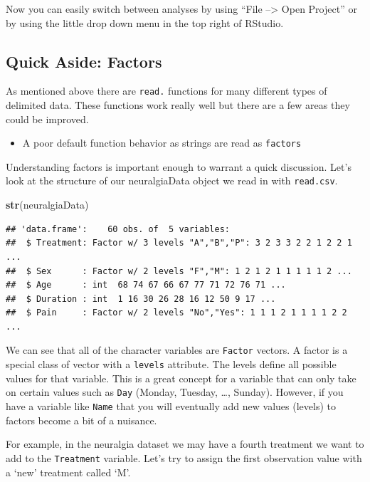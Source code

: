 \documentclass[
]{book}
\newenvironment{Shaded}{\begin{snugshade}}{\end{snugshade}}
\newcommand{\KeywordTok}[1]{\textcolor[rgb]{0.13,0.29,0.53}{\textbf{#1}}}
\newcommand{\NormalTok}[1]{#1}
\providecommand{\tightlist}{%
  \setlength{\itemsep}{0pt}\setlength{\parskip}{0pt}}
\theoremstyle{definition}
\theoremstyle{definition}
\theoremstyle{definition}
\theoremstyle{remark}
\begin{document}
Now you can easily switch between analyses by using ``File --\textgreater{} Open Project'' or by using the little drop down menu in the top right of RStudio.

\hypertarget{quick-aside-factors}{%
\subsection{Quick Aside: Factors}\label{quick-aside-factors}}

As mentioned above there are \texttt{read.} functions for many different types of delimited data. These functions work really well but there are a few areas they could be improved.

\begin{itemize}
\tightlist
\item
  A poor default function behavior as strings are read as \texttt{factors}
\end{itemize}

Understanding factors is important enough to warrant a quick discussion. Let's look at the structure of our neuralgiaData object we read in with \texttt{read.csv}.

\begin{Shaded}
\begin{Highlighting}[]
\KeywordTok{str}\NormalTok{(neuralgiaData)}
\end{Highlighting}
\end{Shaded}

\begin{verbatim}
## 'data.frame':    60 obs. of  5 variables:
##  $ Treatment: Factor w/ 3 levels "A","B","P": 3 2 3 3 2 2 1 2 2 1 ...
##  $ Sex      : Factor w/ 2 levels "F","M": 1 2 1 2 1 1 1 1 1 2 ...
##  $ Age      : int  68 74 67 66 67 77 71 72 76 71 ...
##  $ Duration : int  1 16 30 26 28 16 12 50 9 17 ...
##  $ Pain     : Factor w/ 2 levels "No","Yes": 1 1 1 2 1 1 1 1 2 2 ...
\end{verbatim}

We can see that all of the character variables are \texttt{Factor} vectors. A factor is a special class of vector with a \texttt{levels} attribute. The levels define all possible values for that variable. This is a great concept for a variable that can only take on certain values such as \texttt{Day} (Monday, Tuesday, \ldots{}, Sunday). However, if you have a variable like \texttt{Name} that you will eventually add new values (levels) to factors become a bit of a nuisance.

For example, in the neuralgia dataset we may have a fourth treatment we want to add to the \texttt{Treatment} variable. Let's try to assign the first observation value with a `new' treatment called `M'.
\end{document}
